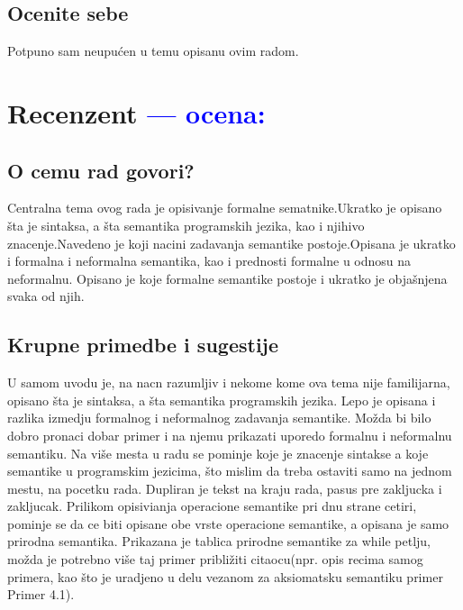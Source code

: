 \documentclass[a4paper]{report}
\newcommand{\odgovor}[1]{\textcolor{blue}{#1}}
\begin{document}
\section{Ocenite sebe}
Potpuno sam neupućen u temu opisanu ovim radom.


\chapter{Recenzent \odgovor{--- ocena:} }


\section{O cemu rad govori?}
Centralna tema ovog rada je  opisivanje formalne sematnike.Ukratko je opisano šta je sintaksa, a šta semantika programskih jezika, kao i njihivo znacenje.Navedeno je koji nacini zadavanja semantike postoje.Opisana je ukratko i formalna i neformalna semantika, kao i prednosti formalne u odnosu na neformalnu. Opisano je koje formalne semantike postoje i ukratko je objašnjena svaka od njih. 


\section{Krupne primedbe i sugestije}
U samom uvodu je, na nacn razumljiv i nekome kome ova tema nije familijarna, opisano šta je sintaksa, a šta semantika programskih jezika. Lepo je opisana i razlika izmedju formalnog i neformalnog zadavanja semantike. Možda bi bilo dobro pronaci dobar primer i na njemu prikazati uporedo formalnu i neformalnu semantiku. Na više mesta u radu se pominje koje je znacenje sintakse a koje semantike u programskim jezicima, što mislim da treba ostaviti samo na jednom mestu, na pocetku rada. Dupliran je tekst na kraju rada, pasus pre zakljucka i zakljucak. Prilikom opisivianja operacione semantike pri dnu strane cetiri, pominje se da ce biti opisane obe vrste operacione semantike, a opisana je samo prirodna  semantika. Prikazana je tablica prirodne semantike za while petlju, možda je potrebno više taj primer približiti citaocu(npr. opis recima samog primera, kao što je uradjeno u delu vezanom za aksiomatsku semantiku primer Primer 4.1).    
\end{document}
